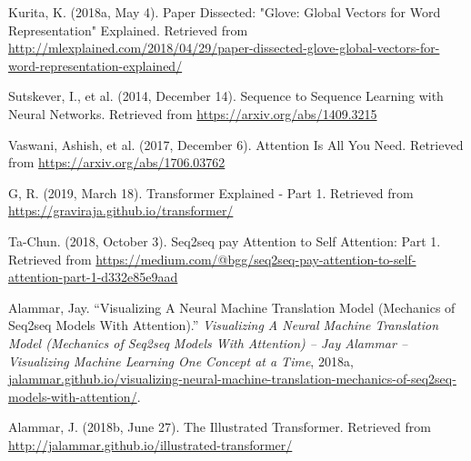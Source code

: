 \begin{frame}{}
    
    
    \begin{enumerateSpaced}{5pt}
    
        \scriptsize
        \setcounter{enumi}{14}
        
        
        \item Kurita, K. (2018a, May 4). Paper Dissected: "Glove: Global Vectors for Word Representation" Explained. Retrieved from \url{http://mlexplained.com/2018/04/29/paper-dissected-glove-global-vectors-for-word-representation-explained/}
        
        \item Sutskever, I., et al. (2014, December 14). Sequence to Sequence Learning with Neural Networks. Retrieved from \url{https://arxiv.org/abs/1409.3215}
        
        \item Vaswani, Ashish, et al. (2017, December 6). Attention Is All You Need. Retrieved from \url{https://arxiv.org/abs/1706.03762}
        
        \item G, R. (2019, March 18). Transformer Explained - Part 1. Retrieved from \url{https://graviraja.github.io/transformer/}
        
        \item Ta-Chun. (2018, October 3). Seq2seq pay Attention to Self Attention: Part 1. Retrieved from \url{https://medium.com/@bgg/seq2seq-pay-attention-to-self-attention-part-1-d332e85e9aad}
        
        \item Alammar, Jay. “Visualizing A Neural Machine Translation Model (Mechanics of Seq2seq Models With Attention).” \emph{Visualizing A Neural Machine Translation Model (Mechanics of Seq2seq Models With Attention) – Jay Alammar – Visualizing Machine Learning One Concept at a Time}, 2018a, \url{jalammar.github.io/visualizing-neural-machine-translation-mechanics-of-seq2seq-models-with-attention/}.
        
        \item Alammar, J. (2018b, June 27). The Illustrated Transformer. Retrieved from \url{http://jalammar.github.io/illustrated-transformer/}
    
    \end{enumerateSpaced}
    
    
\end{frame}



